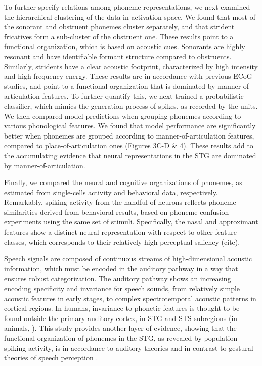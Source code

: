 To further specify relations among phoneme representations, we next examined the hierarchical clustering of the data in activation space. We found that most of the sonorant and obstruent phonemes cluster separately, and that strident fricatives form a sub-cluster of the obstruent one. These results point to a functional organization, which is based on acoustic cues. Sonorants are highly resonant and have identifiable formant structure compared to obstruents. Similarly, stridents have a clear acoustic footprint, characterized by high intensity and high-frequency energy. These results are in accordance with previous ECoG studies, and point to a functional organization that is dominated by manner-of-articulation features. To further quantify this, we next trained a probabilistic classifier, which mimics the generation process of spikes, as recorded by the units. We then compared model predictions when grouping phonemes according to various phonological features. We found that model performance are significantly better when phonemes are grouped according to manner-of-articulation features, compared to place-of-articulation ones (Figures 3C-D \& 4). These results add to the accumulating evidence that neural representations in the STG are dominated by manner-of-articulation.

Finally, we compared the neural and cognitive organizations of phonemes, as estimated from single-cells activity and behavioral data, respectively. Remarkably, spiking activity from the handful of neurons reflects phoneme similarities derived from behavioral results, based on phoneme-confusion experiments using the same set of stimuli. Specifically, the nasal and approximant features show a distinct neural representation with respect to other feature classes, which corresponds to their relatively high perceptual saliency (cite).

Speech signals are composed of continuous streams of high-dimensional acoustic information, which must be encoded in the auditory pathway in a way that ensures robust categorization. The auditory pathway shows an increasing encoding specificity and invariance for speech sounds, from relatively simple acoustic features in early stages, to complex spectrotemporal acoustic patterns in cortical regions. In humans, invariance to phonetic features is thought to be found outside the primary auditory cortex, in STG and STS subregions \citep{Dewitt2012} (in animals, \citealp[see]{mesgarani2008phoneme}). This study provides another layer of evidence, showing that the functional organization of phonemes in the STG, as revealed by population spiking activity, is in accordance to auditory theories and in contrast to gestural theories of speech perception \citep{liberman1985motor, browman1992articulatory}.
